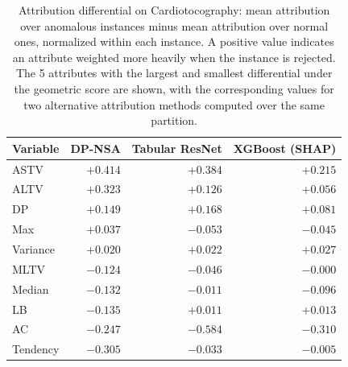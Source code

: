 
\begin{table}[!htbp]
\centering
\caption{Attribution differential on Cardiotocography: mean attribution over anomalous instances minus mean attribution over normal ones, normalized within each instance. A positive value indicates an attribute weighted more heavily when the instance is rejected. The 5 attributes with the largest and smallest differential under the geometric score are shown, with the corresponding values for two alternative attribution methods computed over the same partition.}
\label{tab:saliency}
\small
\begin{tabular}{lrrr}
\toprule
\textbf{Variable} & \textbf{DP-NSA} & \textbf{Tabular ResNet} & \textbf{XGBoost (SHAP)} \\
\midrule
ASTV & \textbf{$+0.414$} & $+0.384$ & $+0.215$ \\
ALTV & \textbf{$+0.323$} & $+0.126$ & $+0.056$ \\
DP & \textbf{$+0.149$} & $+0.168$ & $+0.081$ \\
Max & \textbf{$+0.037$} & $-0.053$ & $-0.045$ \\
Variance & \textbf{$+0.020$} & $+0.022$ & $+0.027$ \\
\midrule
MLTV & \textbf{$-0.124$} & $-0.046$ & $-0.000$ \\
Median & \textbf{$-0.132$} & $-0.011$ & $-0.096$ \\
LB & \textbf{$-0.135$} & $+0.011$ & $+0.013$ \\
AC & \textbf{$-0.247$} & $-0.584$ & $-0.310$ \\
Tendency & \textbf{$-0.305$} & $-0.033$ & $-0.005$ \\
\bottomrule
\end{tabular}
\end{table}
